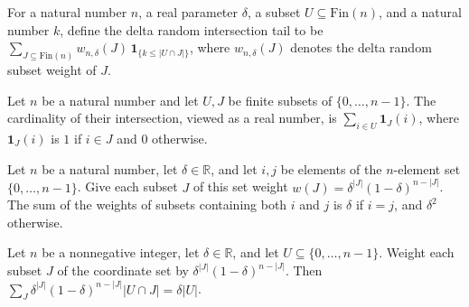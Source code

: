 \begin{definition}
\label{FABL.deltaRandomIntersectionTail}
\leanok
{}
For a natural number $n$, a real parameter $\delta$, a subset
$U\subseteq\mathrm{Fin}(n)$, and a natural number $k$, define the delta random
intersection tail to be $\sum_{J\subseteq\mathrm{Fin}(n)}
w_{n,\delta}(J)\,\mathbf{1}_{\{k\le |U\cap J|\}}$, where $w_{n,\delta}(J)$ denotes the
delta random subset weight of $J$.
\end{definition}

\begin{theorem}
\label{FABL.card_inter_eq_sum_memIndicator}
\leanok
{}
Let $n$ be a natural number and let $U,J$ be finite subsets of $\{0,\ldots,n-1\}$.
The cardinality of their intersection, viewed as a real number, is $\sum_{i\in
U}\mathbf{1}_{J}(i)$, where $\mathbf{1}_{J}(i)$ is $1$ if $i\in J$ and $0$ otherwise.
\end{theorem}

\begin{theorem}
\label{FABL.sum_deltaRandomSubsetWeight_pair_mem}
\leanok
{}
Let $n$ be a natural number, let $\delta\in\mathbb{R}$, and let $i,j$ be elements of the
$n$-element set $\{0,\ldots,n-1\}$. Give each subset $J$ of this set weight
$w(J)=\delta^{|J|}(1-\delta)^{n-|J|}$. The sum of the weights of subsets containing both $i$
and $j$ is $\delta$ if $i=j$, and $\delta^2$ otherwise.
\end{theorem}

\begin{theorem}
\label{FABL.sum_deltaRandomSubsetWeight_mul_card_inter}
\leanok
{}
Let $n$ be a nonnegative integer, let $\delta\in\mathbb R$, and let
$U\subseteq\{0,\ldots,n-1\}$. Weight each subset $J$ of the coordinate set by
$\delta^{|J|}(1-\delta)^{n-|J|}$. Then $\sum_J \delta^{|J|}(1-\delta)^{n-|J|}|U\cap
J|=\delta|U|$.
\end{theorem}

